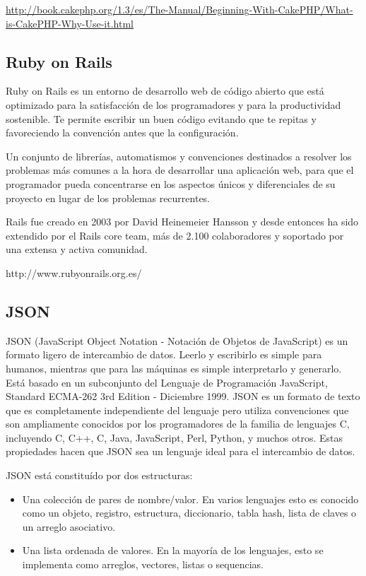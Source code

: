 \url{http://book.cakephp.org/1.3/es/The-Manual/Beginning-With-CakePHP/What-is-CakePHP-Why-Use-it.html}


\subsection{Ruby on Rails}
Ruby on Rails es un entorno de desarrollo web de código abierto que está optimizado para la satisfacción de los programadores y para la productividad sostenible. Te permite escribir un buen código evitando que te repitas y favoreciendo la convención antes que la configuración.

Un conjunto de librerías, automatismos y convenciones destinados a resolver los problemas más comunes a la hora de desarrollar una aplicación web, para que el programador pueda concentrarse en los aspectos únicos y diferenciales de su proyecto en lugar de los problemas recurrentes.

Rails fue creado en 2003 por David Heinemeier Hansson y desde entonces ha sido extendido por el Rails core team, más de 2.100 colaboradores y soportado por una extensa y activa comunidad.

http://www.rubyonrails.org.es/

\subsection{JSON}

JSON (JavaScript Object Notation - Notación de Objetos de JavaScript) es un formato ligero de intercambio de datos. Leerlo y escribirlo es simple para humanos, mientras que para las máquinas es simple interpretarlo y generarlo. Está basado en un subconjunto del Lenguaje de Programación JavaScript, Standard ECMA-262 3rd Edition - Diciembre 1999. JSON es un formato de texto que es completamente independiente del lenguaje pero utiliza convenciones que son ampliamente conocidos por los programadores de la familia de lenguajes C, incluyendo C, C++, C, Java, JavaScript, Perl, Python, y muchos otros. Estas propiedades hacen que JSON sea un lenguaje ideal para el intercambio de datos.

JSON está constituído por dos estructuras:
  
\begin{itemize}

	\item Una colección de pares de nombre/valor. En varios lenguajes esto es conocido como un objeto, registro, estructura, diccionario, tabla hash, lista de claves o un arreglo asociativo.
	
	\item Una lista ordenada de valores. En la mayoría de los lenguajes, esto se implementa como arreglos, vectores, listas o sequencias.

	
\end{itemize}

